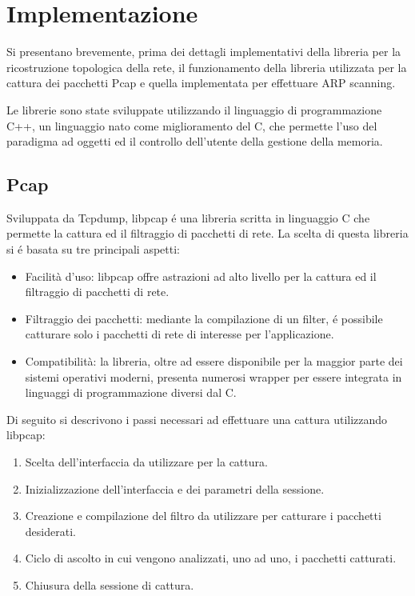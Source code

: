 \section{Implementazione}
Si presentano brevemente, prima dei dettagli implementativi della libreria per la ricostruzione topologica della rete, il funzionamento della libreria utilizzata per la cattura dei pacchetti Pcap e quella implementata per effettuare ARP scanning.

Le librerie sono state sviluppate utilizzando il linguaggio di programmazione C++, un linguaggio nato come miglioramento del C, che permette l'uso del paradigma ad oggetti ed il controllo dell'utente della gestione della memoria.

\subsection{Pcap}

Sviluppata da Tcpdump, libpcap  \'e una libreria scritta in linguaggio C che permette la cattura ed il filtraggio di pacchetti di rete.
La scelta di questa libreria si \'e basata su tre principali aspetti:
\begin{itemize}
	\item Facilit\`a d'uso: libpcap offre astrazioni ad alto livello per la cattura ed il filtraggio di pacchetti di rete.
	\item Filtraggio dei pacchetti: mediante la compilazione di un filter, \'e possibile catturare solo i pacchetti di rete di interesse per l'applicazione.  
	\item Compatibilit\`a: la libreria, oltre ad essere disponibile per la maggior parte dei sistemi operativi moderni, presenta numerosi wrapper per essere integrata in linguaggi di programmazione diversi dal C.
\end{itemize}
Di seguito si descrivono i passi necessari ad effettuare una cattura utilizzando libpcap:
\begin{enumerate}
	\item Scelta dell'interfaccia da utilizzare per la cattura.
	\item Inizializzazione dell'interfaccia e dei parametri della sessione.
	\item Creazione e compilazione del filtro da utilizzare per catturare i pacchetti desiderati. 
	\item Ciclo di ascolto in cui vengono analizzati, uno ad uno, i pacchetti catturati.
	\item Chiusura della sessione di cattura.
\end{enumerate}


